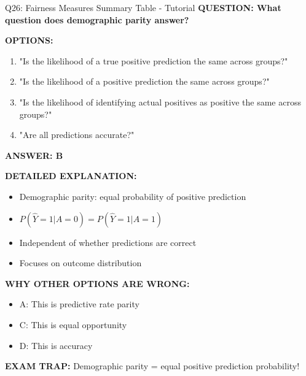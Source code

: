 \documentclass[8pt]{beamer}
\begin{document}
	\begin{frame}{Q26: Fairness Measures Summary Table - Tutorial}
		\fontsize{6.5}{7.5}\selectfont
		\textbf{QUESTION: What question does demographic parity answer?}
		
		\vspace{0.1cm}
		\textbf{OPTIONS:}
		\begin{enumerate}
			\item "Is the likelihood of a true positive prediction the same across groups?"
			\item "Is the likelihood of a positive prediction the same across groups?"
			\item "Is the likelihood of identifying actual positives as positive the same across groups?"
			\item "Are all predictions accurate?"
		\end{enumerate}
		
		\vspace{0.1cm}
		\textcolor{myblue}{\textbf{ANSWER: B}}
		
		\vspace{0.1cm}
		\textbf{DETAILED EXPLANATION:}
		\begin{itemize}
			\item Demographic parity: equal probability of positive prediction
			\item $P(\hat{Y}=1|A=0) = P(\hat{Y}=1|A=1)$
			\item Independent of whether predictions are correct
			\item Focuses on outcome distribution
		\end{itemize}
		
		\vspace{0.1cm}
		\textcolor{myred}{\textbf{WHY OTHER OPTIONS ARE WRONG:}}
		\begin{itemize}
			\item \textcolor{myred}{A:} This is predictive rate parity
			\item \textcolor{myred}{C:} This is equal opportunity
			\item \textcolor{myred}{D:} This is accuracy
		\end{itemize}
		
		\textcolor{myred}{\textbf{EXAM TRAP:}} Demographic parity = \textcolor{myblue}{equal positive prediction probability}!
	\end{frame}
	
\end{document}
